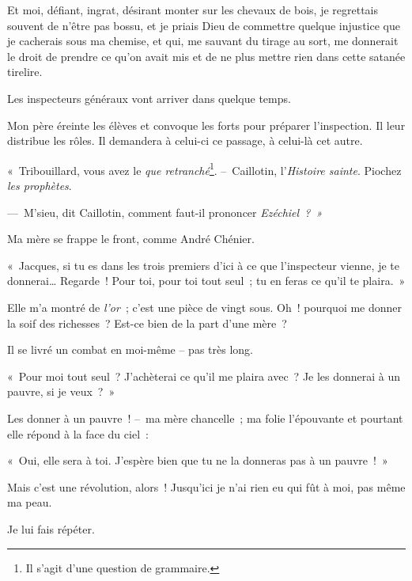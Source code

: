 \documentclass[french,twoside]{book} %
\def\mednobreak{\ifdim\lastskip<\medskipamount
  \removelastskip\nopagebreak\medskip\fi}
\newcommand{\labelblock}[1]{\medbreak{\noindent\color{rubric}\bfseries #1}\par\mednobreak}
\begin{document}
Et moi, défiant, ingrat, désirant monter sur les chevaux de bois, je regrettais souvent de n’être pas bossu, et je priais Dieu de commettre quelque injustice que je cacherais sous ma chemise, et qui, me sauvant du tirage au sort, me donnerait le droit de prendre ce qu’on avait mis et de ne plus mettre rien dans cette satanée tirelire.\par
\bigbreak
\noindent Les inspecteurs généraux vont arriver dans quelque temps.\par
Mon père éreinte les élèves et convoque les forts pour préparer l’inspection. Il leur distribue les rôles. Il demandera à celui-ci ce passage, à celui-là cet autre.\par
« Tribouillard, vous avez le \emph{que retranché}\footnote{Il s’agit d’une question de grammaire.}. – Caillotin, l’\emph{Histoire sainte}. Piochez \emph{les prophètes}.\par
— M’sieu, dit Caillotin, comment faut-il prononcer \emph{Ezéchiel ? »}\par
\bigbreak
\noindent Ma mère se frappe le front, comme André Chénier.\par
« Jacques, si tu es dans les trois premiers d’ici à ce que l’inspecteur vienne, je te donnerai… Regarde ! Pour toi, pour toi tout seul ; tu en feras ce qu’il te plaira. »\par
Elle m’a montré de \emph{l’or} ; c’est une pièce de vingt sous. Oh ! pourquoi me donner la soif des richesses ? Est-ce bien de la part d’une mère ?\par
Il se livré un combat en moi-même – pas très long.\par
« Pour moi tout seul ? J’achèterai ce qu’il me plaira avec ? Je les donnerai à un pauvre, si je veux ? »\par
Les donner à un pauvre ! – ma mère chancelle ; ma folie l’épouvante et pourtant elle répond à la face du ciel :\par
« Oui, elle sera à toi. J’espère bien que tu ne la donneras pas à un pauvre ! »\par
Mais c’est une révolution, alors ! Jusqu’ici je n’ai rien eu qui fût à moi, pas même ma peau.\par
Je lui fais répéter.\par

\labelblock{Minuit.}
\end{document}
